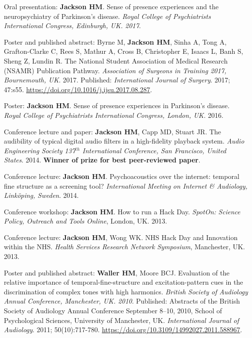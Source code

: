 \documentclass[a4paper, oneside, final, 11pt]{scrartcl} %
\begin{document}
\bigskip

Oral presentation: \textbf{Jackson HM}. Sense of presence experiences and the neuropsychiatry of Parkinson's disease. \textit{Royal College of Psychiatrists International Congress, Edinburgh, UK. 2017}.

\bigskip

Poster and published abstract: Byrne M, \textbf{Jackson HM}, Sinha A, Tong A, Grafton-Clarke C, Rees S, Mathur A, Cross B, Christopher E, Isaacs L, Banh S, Sheng Z, Lundin R. The National Student Association of Medical Research (NSAMR) Publication Pathway. \textit{Association of Surgeons in Training 2017, Bournemouth, UK}. 2017. Published: \textit{International Journal of Surgery}. 2017; 47:s55. \url{https://doi.org/10.1016/j.ijsu.2017.08.287}.

\bigskip

Poster: \textbf{Jackson HM}. Sense of presence experiences in Parkinson's disease. \textit{Royal College of Psychiatrists International Congress, London, UK}. 2016.

\bigskip

Conference lecture and paper: \textbf{Jackson HM}, Capp MD, Stuart JR. The audibility of typical digital audio filters in a high-fidelity playback system. \textit{Audio Engineering Society 137$^{th}$ International Conference, San Francisco, United States}. 2014. \textbf{Winner of prize for best peer-reviewed paper}.

\bigskip

Conference lecture: \textbf{Jackson HM}. Psychoacoustics over the internet: temporal fine structure as a screening tool? \textit{International Meeting on Internet \& Audiology, Link{\"o}ping, Sweden}. 2014.

\bigskip

Conference workshop: \textbf{Jackson HM}. How to run a Hack Day. \textit{SpotOn: Science Policy, Outreach and Tools Online}, London, UK. 2013.

\bigskip

Conference lecture: \textbf{Jackson HM}, Wong WK. NHS Hack Day and Innovation within the NHS. \textit{Health Services Research Network Symposium}, Manchester, UK. 2013.

\bigskip

Poster and published abstract: \textbf{Waller HM}, Moore BCJ. Evaluation of the relative importance of temporal-fine-structure and excitation-pattern cues in the discrimination of complex tones with high harmonics. \textit{British Society of Audiology Annual Conference, Manchester, UK. 2010}. Published: Abstracts of the British Society of Audiology Annual Conference September 8--10, 2010, School of Psychological Sciences, University of Manchester, UK. \textit{International Journal of Audiology}. 2011; 50(10):717-780. \url{https://doi.org/10.3109/14992027.2011.588967}.
\end{document}
